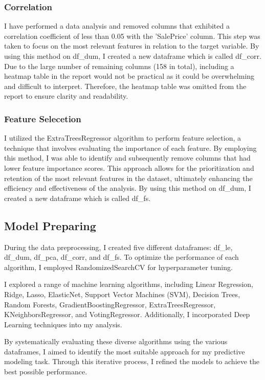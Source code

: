 \subsubsection{Correlation}

I have performed a data analysis and removed columns that exhibited a correlation coefficient of less than 0.05 with the 'SalePrice' column. This step was taken to focus on the most relevant features in relation to the target variable. By using this method on df\_dum, I created a new dataframe which is called df\_corr. Due to the large number of remaining columns (158 in total), including a heatmap table in the report would not be practical as it could be overwhelming and difficult to interpret. Therefore, the heatmap table was omitted from the report to ensure clarity and readability.


\subsubsection{Feature Selecetion}
I utilized the ExtraTreesRegressor algorithm to perform feature selection, a technique that involves evaluating the importance of each feature. By employing this method, I was able to identify and subsequently remove columns that had lower feature importance scores. This approach allows for the prioritization and retention of the most relevant features in the dataset, ultimately enhancing the efficiency and effectiveness of the analysis. By using this method on df\_dum, I created a new dataframe which is called df\_fs.

\newpage
 \subsection{Model Preparing}


During the data preprocessing, I created five different dataframes: df\_le, df\_dum, df\_pca, df\_corr, and df\_fs. To optimize the performance of each algorithm, I employed RandomizedSearchCV for hyperparameter tuning.\newline

I explored a range of machine learning algorithms, including Linear Regression, Ridge, Lasso, ElasticNet, Support Vector Machines (SVM), Decision Trees, Random Forests, GradientBoostingRegressor, ExtraTreesRegressor, KNeighborsRegressor, and VotingRegressor. Additionally, I incorporated Deep Learning techniques into my analysis. \newline

By systematically evaluating these diverse algorithms using the various dataframes, I aimed to identify the most suitable approach for my predictive modeling task. Through this iterative process, I refined the models to achieve the best possible performance.
\newpage
